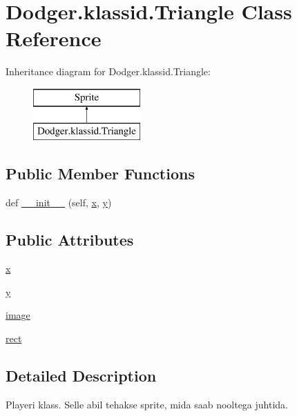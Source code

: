\hypertarget{class_dodger_1_1klassid_1_1_triangle}{}\section{Dodger.\+klassid.\+Triangle Class Reference}
\label{class_dodger_1_1klassid_1_1_triangle}
Inheritance diagram for Dodger.\+klassid.\+Triangle\+:\begin{figure}[H]
\begin{center}
\leavevmode
\includegraphics[height=2.000000cm]{class_dodger_1_1klassid_1_1_triangle}
\end{center}
\end{figure}
\subsection*{Public Member Functions}
\begin{DoxyCompactItemize}
\item 
def \hyperlink{class_dodger_1_1klassid_1_1_triangle_a7eaf0a102d5a2ad5e549b73842cd8854}{\+\_\+\+\_\+init\+\_\+\+\_\+} (self, \hyperlink{class_dodger_1_1klassid_1_1_triangle_a17a330d3cf14156818f35ca702d11bee}{x}, \hyperlink{class_dodger_1_1klassid_1_1_triangle_a36eb6984b804d8702084420f442d7917}{y})
\end{DoxyCompactItemize}
\subsection*{Public Attributes}
\begin{DoxyCompactItemize}
\item 
\hyperlink{class_dodger_1_1klassid_1_1_triangle_a17a330d3cf14156818f35ca702d11bee}{x}
\item 
\hyperlink{class_dodger_1_1klassid_1_1_triangle_a36eb6984b804d8702084420f442d7917}{y}
\item 
\hyperlink{class_dodger_1_1klassid_1_1_triangle_a9b7fe7062ff2875d4de3221a3c2e4713}{image}
\item 
\hyperlink{class_dodger_1_1klassid_1_1_triangle_a050d0b0e4a98555475e3f4fc2ab7b863}{rect}
\end{DoxyCompactItemize}


\subsection{Detailed Description}
\begin{DoxyVerb}Playeri klass. Selle abil tehakse sprite, mida saab nooltega juhtida.
\end{DoxyVerb}
 

